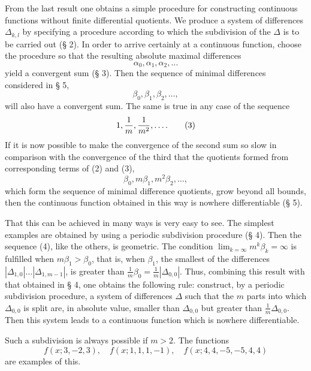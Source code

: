 \documentclass[11pt,a4paper]{article}
\begin{document}
From the last result one obtains a simple procedure for constructing continuous functions without finite differential quotients. We produce a system of differences $\Delta_{k,l}$ by specifying a procedure according to which the subdivision of the $\Delta$ is to be carried out (§ 2). In order to arrive certainly at a continuous function, choose the procedure so that the resulting absolute maximal differences
\begin{equation}
 \alpha_0,\alpha_1,\alpha_2,\ldots
\tag{1}
\end{equation}
yield a convergent sum (§ 3). Then the sequence of minimal differences considered in § 5,
\begin{equation}
 \beta_0,\beta_1,\beta_2,\ldots,
\tag{2}
\end{equation}
will also have a convergent sum. The same is true in any case of the sequence
\begin{equation}
 1,{1\over m},{1\over m^2},\ldots.
\tag{3}
\end{equation}
If it is now possible to make the convergence of the second sum so slow in comparison with the convergence of the third that the quotients formed from corresponding terms of (2) and (3),
\begin{equation}
 \beta_0,m\beta_1,m^2\beta_2,\ldots,
\tag{4}
\end{equation}
which form the sequence of minimal difference quotients, grow beyond all bounds, then the continuous function obtained in this way is nowhere differentiable (§ 5).

That this can be achieved in many ways is very easy to see. The simplest examples are obtained by using a periodic subdivision procedure (§ 4). Then the sequence (4), like the others, is geometric. The condition $\lim_{k=\infty}m^k\beta_k=\infty$ is fulfilled when $m\beta_1>\beta_0$, that is, when $\beta_1$, the smallest of the differences $|\Delta_{1,0}|\ldots|\Delta_{1,m-1}|$, is greater than $\frac1m\beta_0=\frac1m|\Delta_{0,0}|$. Thus, combining this result with that obtained in § 4, one obtains the following rule: construct, by a periodic subdivision procedure, a system of differences $\Delta$ such that the $m$ parts into which $\Delta_{0,0}$ is split are, in absolute value, smaller than $\Delta_{0,0}$ but greater than $\frac1m\Delta_{0,0}$. Then this system leads to a continuous function which is nowhere differentiable.

Such a subdivision is always possible if $m>2$. The functions
\[
 f(x;3,-2,3),\quad f(x;1,1,1,-1),\quad f(x;4,4,-5,-5,4,4)
\]
are examples of this.
\end{document}
